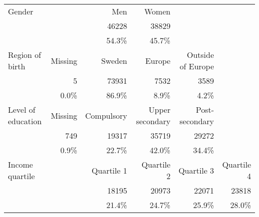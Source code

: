 \begin{tabular}{@{}l*{5}{r}@{}}
\toprule
Gender              &               & {Men}         & {Women}           &                     &                 \tabularnewline
                    &               & \num{46228}   & \num{38829}       &                     &                 \tabularnewline
                    &               & 54.3\%        & 45.7\%            &                     &                 \tabularnewline
\midrule
Region of birth     & {Missing}     & {Sweden}      & {Europe}          & {Outside of Europe} &                 \tabularnewline
                    & \num{5}       & \num{73931}   & \num{7532}        & \num{3589}          &                 \tabularnewline
                    & 0.0\%         & 86.9\%        & 8.9\%             & 4.2\%               &                 \tabularnewline
\midrule
Level of education  & {Missing}     & {Compulsory}  & {Upper secondary} & {Post-secondary}    &                 \tabularnewline
                    & \num{749}     & \num{19317}   & \num{35719}       & \num{29272}         &                 \tabularnewline
                    & 0.9\%         & 22.7\%        & 42.0\%            & 34.4\%              &                 \tabularnewline
\midrule
Income quartile     &               & {Quartile 1}  & {Quartile 2}      & {Quartile 3}        & {Quartile 4}    \tabularnewline
                    &               & \num{18195}   & \num{20973}       & \num{22071}         & \num{23818}     \tabularnewline
                    &               & 21.4\%        & 24.7\%            & 25.9\%              & 28.0\%          \tabularnewline
\bottomrule
\end{tabular}